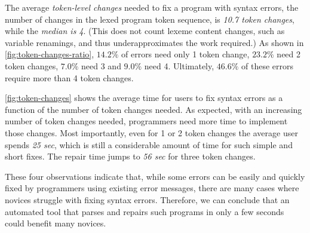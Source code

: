 %
The average \emph{token-level changes} needed to fix a program with syntax
errors, \ie the number of changes in the lexed program token sequence, is
\emph{10.7 token changes}, while the \emph{median is 4}.
%
(This does not count lexeme content changes, such as variable renamings, 
and thus underapproximates the work required.) 
%
As shown in \autoref{fig:token-changes-ratio}, $14.2\%$ of errors
need only 1 token change, $23.2\%$ need 2 token changes, $7.0\%$
need 3 and $9.0\%$ need 4.
Ultimately, $46.6\%$ of these errors require more than 4 token changes.
%

%
\autoref{fig:token-changes} shows the average time for users to fix
syntax errors as a function of the number of token changes needed. 
As expected, with an increasing number of token changes needed,
programmers need more time to implement those changes. Most importantly, even
for 1 or 2 token changes the average user spends \emph{25 sec},
which is still a considerable amount of time for such simple and
short fixes. The repair time jumps to \emph{56 sec} for three token changes.

\smallskip
These four observations indicate that, while some errors can be
easily and quickly fixed by programmers using existing error messages,
there are many cases where novices struggle with fixing syntax errors.
%
Therefore, we can conclude that an automated tool that parses and repairs
such programs in only a few seconds could benefit many novices.
